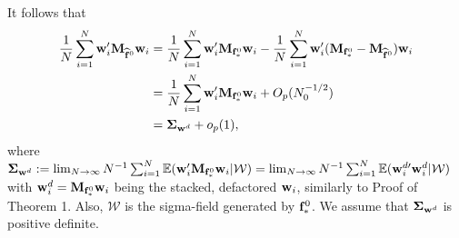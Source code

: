 \documentclass[12pt,fleqn]{article}
\begin{document}
It follows that
\begin{align}
\frac{1}{N}\sum_{i=1}^N  \mathbf{w}_{i}'\mathbf{M}_{\widehat{\mathbf{f}}^0}\mathbf{w}_{i} & = \frac{1}{N}\sum_{i=1}^N  \mathbf{w}_{i}'\mathbf{M}_{\mathbf{f}_*^0}\mathbf{w}_{i} - \frac{1}{N}\sum_{i=1}^N  \mathbf{w}_{i}'(\mathbf{M}_{\mathbf{f}_*^0} - \mathbf{M}_{\widehat{\mathbf{f}}^0})\mathbf{w}_{i} \notag\\
& = \frac{1}{N}\sum_{i=1}^N  \mathbf{w}_{i}'\mathbf{M}_{\mathbf{f}_*^0}\mathbf{w}_{i} + O_p(N_0^{-1/2})\notag\\
& = \boldsymbol{\Sigma}_{\mathbf{w}^d} + o_p(1),
\end{align}
where $\boldsymbol{\Sigma}_{\mathbf{w}^d} := \lim_{N\to\infty}N^{-1}\sum_{i=1}^N \mathbb{E}  (\mathbf{w}_{i}'\mathbf{M}_{\mathbf{f}_*^0}\mathbf{w}_{i} |\mathcal{W} ) = \lim_{N\to\infty}N^{-1}\sum_{i=1}^N \mathbb{E}  (\mathbf{w}_{i}^{d\prime}\mathbf{w}_{i}^d |\mathcal{W} )$ with $\mathbf{w}_{i}^d = \mathbf{M}_{\mathbf{f}_*^0}\mathbf{w}_{i}$ being the stacked, defactored $\mathbf{w}_{i}$, similarly to Proof of Theorem 1. Also, $\mathcal{W}$ is the sigma-field generated by $\mathbf{f}_*^0$. We assume that $\boldsymbol{\Sigma}_{\mathbf{w}^d}$ is positive definite.
\end{document}
